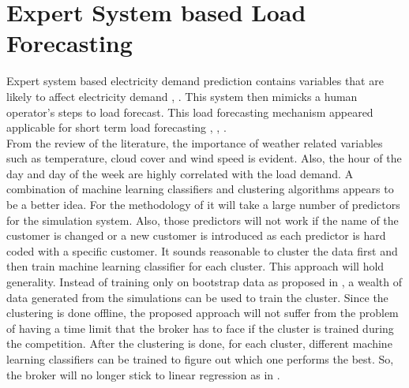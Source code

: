 \section{Expert System based Load Forecasting}

Expert system based electricity demand prediction contains variables that are likely to affect electricity demand \cite{rahman1988expert}, \cite{ho1990short}. This system then mimicks a human operator's steps to load forecast. This load forecasting mechanism appeared applicable for short term load forecasting \cite{rahman1988expert}, \cite{ho1990short}, \cite{moghram1989analysis}. \\

From the review of the literature, the importance of weather related variables such as temperature, cloud cover and wind speed is evident. Also, the hour of the day and day of the week are highly correlated with the load demand. A combination of machine learning classifiers and clustering algorithms appears to be a better idea. For the methodology of \cite{parra2013initial} it will take a large number of predictors for the simulation system. Also, those predictors will not work if the name of the customer is changed or a new customer is introduced as each predictor is hard coded with a specific customer. It sounds reasonable to cluster the data first and then train machine learning classifier for each cluster. This approach will hold generality. Instead of training only on bootstrap data as proposed in \cite{wang2015gongbroker}, a wealth of data generated from the simulations can be used to  train the cluster. Since the clustering is done offline, the proposed approach will not  suffer from the problem of having a time limit that the broker has to face if the cluster is trained during the competition. After the clustering is done, for each cluster, different machine learning classifiers can be trained to figure out which one performs the best. So, the broker will no longer stick to linear regression as in \cite{wang2015gongbroker}.

